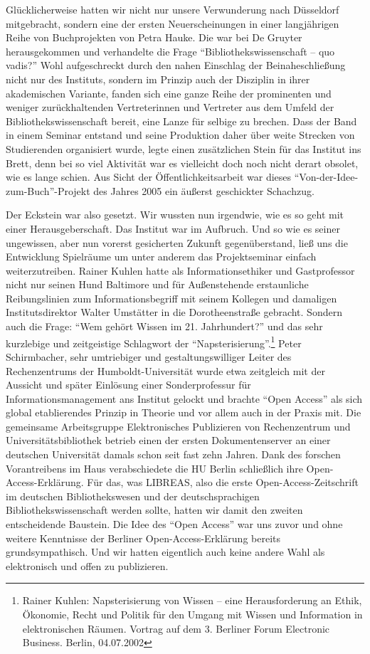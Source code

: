 \documentclass[output=paper]{langsci/langscibook}
\begin{document}
Glücklicherweise hatten wir nicht nur unsere Verwunderung nach
Düsseldorf mitgebracht, sondern eine der ersten Neuerscheinungen in
einer langjährigen Reihe von Buchprojekten von Petra Hauke. Die war bei
De Gruyter herausgekommen und verhandelte die Frage
\enquote{Bibliothekswissenschaft -- quo vadis?} Wohl aufgeschreckt durch
den nahen Einschlag der Beinaheschließung nicht nur des Instituts,
sondern im Prinzip auch der Disziplin in ihrer akademischen Variante,
fanden sich eine ganze Reihe der prominenten und weniger zurückhaltenden
Vertreterinnen und Vertreter aus dem Umfeld der Bibliothekswissenschaft
bereit, eine Lanze für selbige zu brechen. Dass der Band in einem
Seminar entstand und seine Produktion daher über weite Strecken von
Studierenden organisiert wurde, legte einen zusätzlichen Stein für das
Institut ins Brett, denn bei so viel Aktivität war es vielleicht doch
noch nicht derart obsolet, wie es lange schien. Aus Sicht der
Öffentlichkeitsarbeit war dieses \enquote{Von-der-Idee-zum-Buch}-Projekt
des Jahres 2005 ein äußerst geschickter Schachzug.

Der Eckstein war also gesetzt. Wir wussten nun irgendwie, wie es so geht
mit einer Herausgeberschaft. Das Institut war im Aufbruch. Und so wie es
seiner ungewissen, aber nun vorerst gesicherten Zukunft gegenüberstand,
ließ uns die Entwicklung Spielräume um unter anderem das Projektseminar
einfach weiterzutreiben. Rainer Kuhlen hatte als Informationsethiker und
Gastprofessor nicht nur seinen Hund Baltimore und für Außenstehende
erstaunliche Reibungslinien zum Informationsbegriff mit seinem Kollegen
und damaligen Institutsdirektor Walter Umstätter in die Dorotheenstraße
gebracht. Sondern auch die Frage: \enquote{Wem gehört Wissen im 21.
Jahrhundert?} und das sehr kurzlebige und zeitgeistige Schlagwort der
\enquote{Napsterisierung}.\footnote{Rainer Kuhlen: Napsterisierung von
  Wissen -- eine Herausforderung an Ethik, Ökonomie, Recht und Politik
  für den Umgang mit Wissen und Information in elektronischen Räumen.
  Vortrag auf dem 3. Berliner Forum Electronic Business. Berlin,
  04.07.2002} Peter Schirmbacher, sehr umtriebiger und
gestaltungswilliger Leiter des Rechenzentrums der Humboldt-Universität
wurde etwa zeitgleich mit der Aussicht und später Einlösung einer
Sonderprofessur für Informationsmanagement ans Institut gelockt und
brachte \enquote{Open Access} als sich global etablierendes Prinzip in
Theorie und vor allem auch in der Praxis mit. Die gemeinsame
Arbeitsgruppe Elektronisches Publizieren von Rechenzentrum und
Universitätsbibliothek betrieb einen der ersten Dokumentenserver an
einer deutschen Universität damals schon seit fast zehn Jahren. Dank des
forschen Vorantreibens im Haus verabschiedete die HU Berlin schließlich
ihre Open-Access-Erklärung. Für das, was LIBREAS, also die erste
Open-Access-Zeitschrift im deutschen Bibliothekswesen und der
deutschsprachigen Bibliothekswissenschaft werden sollte, hatten wir
damit den zweiten entscheidende Baustein. Die Idee des \enquote{Open
Access} war uns zuvor und ohne weitere Kenntnisse der Berliner
Open-Access-Erklärung bereits grundsympathisch. Und wir hatten
eigentlich auch keine andere Wahl als elektronisch und offen zu
publizieren.
\end{document}
